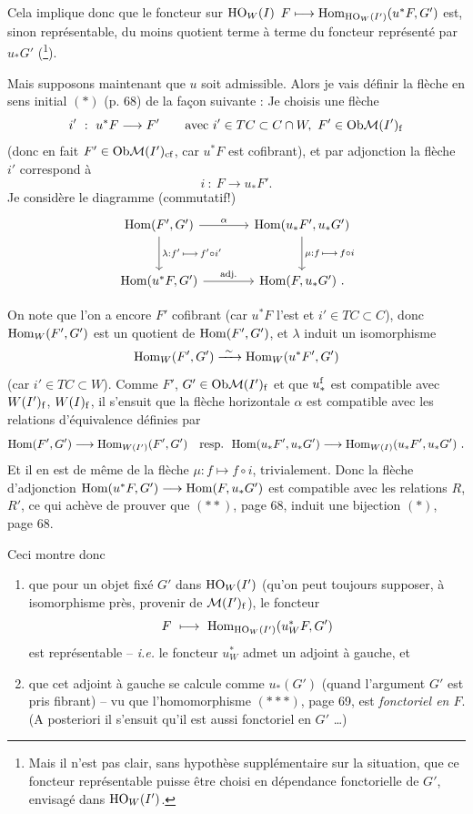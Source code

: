 
Cela implique donc que le foncteur sur $\mathrm{HO}_W(I)$ $F \longmapsto \mathrm{Hom}_{\mathrm{HO}_{W}(I')}(u^*F,G')$ est, sinon représentable, du moins quotient terme à terme du foncteur représenté par $u_*G'$ (\footnote[37]{Mais il n'est pas clair, sans hypothèse supplémentaire sur la situation, que ce foncteur représentable puisse être choisi en dépendance fonctorielle de $G'$, envisagé dans $\mathrm{HO}_W(I')$.}).


Mais supposons maintenant que $u$ soit admissible. Alors je vais définir la flèche en sens initial $(*)$ (p. 68) de la façon suivante : Je choisis une flèche
\[
i' \ : \ u^*F \longrightarrow F' \qquad \text{avec } i' \in TC \subset C \cap W,\ F' \in \mathrm{Ob} \mathcal{M}(I')_{\mathrm{f}}
\]
(donc en fait $F' \in \mathrm{Ob} \mathcal{M}(I')_{\mathrm{cf}}$, car $u^*F$ est cofibrant), et par adjonction la flèche $i'$ correspond à
\[
i \ : \ F \longrightarrow u_*F'.
\]
Je considère le diagramme (commutatif!)
\[
\begin{tikzcd}[column sep=large, row sep=large]
\Hom(F',G') \arrow[r, "\alpha"] \arrow[d, "{\scriptstyle \lambda:f'\,\longmapsto\, f'\circ i'}"] & \Hom(u_*F',u_*G') \arrow[d, "{\scriptstyle \mu:f\,\longmapsto\, f\circ i}"] \\
\Hom(u^*F,G') \arrow[r, "\text{adj.}"] & \Hom(F,u_*G')\ .
\end{tikzcd}
\]

On note que l'on a encore $F'$ cofibrant (car $u^*F$ l'est et $i' \in TC \subset C$), donc $\mathrm{Hom}_W(F',G')$ est un quotient de $\mathrm{Hom}(F',G')$, et $\lambda$ induit un isomorphisme
\[
\Hom_W(F',G') \xrightarrow{\ \sim\ } \Hom_W(u^*F',G') %
\]
(car $i' \in TC \subset W$). Comme $F'$, $G' \in \mathrm{Ob} \mathcal{M}(I')_{\mathrm{f}}$ et que $u_*^{\mathrm{f}}$ est compatible avec $W(I')_{\mathrm{f}}$, $W(I)_{\mathrm{f}}$, il s'ensuit que la flèche horizontale $\alpha$
est compatible avec les relations d'équivalence définies par
\[
\mathrm{Hom}(F',G') \longrightarrow \mathrm{Hom}_{W(I')}(F',G') \quad \text{resp.} \ \ \mathrm{Hom}(u_*F',u_*G') \longrightarrow \mathrm{Hom}_{W(I)}(u_*F',u_*G')\ .
\]
Et il en est de même de la flèche $\mu : f \longmapsto f \circ i$, trivialement. Donc la flèche d'adjonction $\mathrm{Hom}(u^*F,G') \longrightarrow \mathrm{Hom}(F,u_*G')$ est compatible avec les relations $R$, $R'$, ce qui achève de prouver que $(**)$, page 68, induit une bijection $(*)$, page 68.

Ceci montre donc

\begin{enumerate}
\item[1°)] que pour un objet fixé $G'$ dans $\mathrm{HO}_W(I')$ (qu'on peut toujours supposer, à isomorphisme près, provenir de $\mathcal{M}(I')_{\mathrm{f}}$), le foncteur
\[
F \ \longmapsto\ \mathrm{Hom}_{\mathrm{HO}_{W}(I')}(u^*_W F,G')
\]
est représentable -- \textit{i.e.} le foncteur $u^*_W$ admet un adjoint à gauche, et
\item[2°)] que cet adjoint à gauche se calcule comme $u_*(G')$ (quand l'argument $G'$ est pris fibrant) -- vu que l'homomorphisme $({*}{*}{*})$, page 69, est \textit{fonctoriel en $F$}. (A posteriori il s'ensuit qu'il est aussi fonctoriel en $G'$ \dots)
\end{enumerate}

